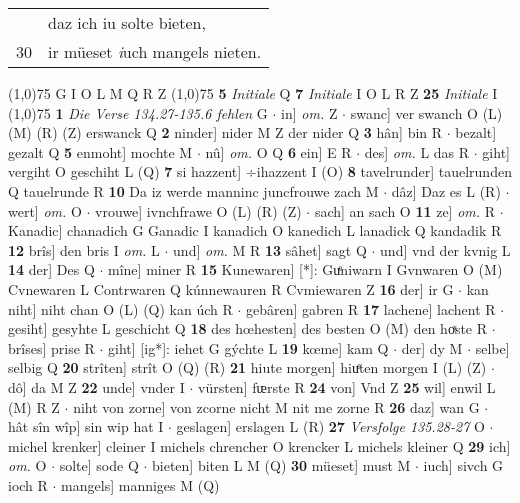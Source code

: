 \documentclass[8pt,a4paper,notitlepage]{article}
\begin{document}
\begin{table}[ht]
\begin{minipage}[t]{0.5\linewidth}
\begin{tabular}{rl}
 & daz ich iu solte bieten,\\ 
30 & ir müeset \textit{i}uch mangels nieten.\\ 
\end{tabular}
\scriptsize
\line(1,0){75} \newline
G I O L M Q R Z \newline
\line(1,0){75} \newline
\textbf{5} \textit{Initiale} Q  \textbf{7} \textit{Initiale} I O L R Z  \textbf{25} \textit{Initiale} I  \newline
\line(1,0){75} \newline
\textbf{1} \textit{Die Verse 134.27-135.6 fehlen} G   $\cdot$ in] \textit{om.} Z  $\cdot$ swanc] ver swanch O (L) (M) (R) (Z) erswanck Q \textbf{2} ninder] nider M Z der nider Q \textbf{3} hân] bin R  $\cdot$ bezalt] gezalt Q \textbf{5} enmoht] mochte M  $\cdot$ nû] \textit{om.} O Q \textbf{6} ein] E R  $\cdot$ des] \textit{om.} L das R  $\cdot$ giht] vergiht O geschiht L (Q) \textbf{7} si hazzent] ÷ihazzent I (O) \textbf{8} tavelrunder] tauelrunden Q tauelrunde R \textbf{10} Da iz werde manninc juncfrouwe zach M  $\cdot$ dâz] Daz es L (R)  $\cdot$ wert] \textit{om.} O  $\cdot$ vrouwe] ivnchfrawe O (L) (R) (Z)  $\cdot$ sach] an sach O \textbf{11} ze] \textit{om.} R  $\cdot$ Kanadic] chanadich G Ganadic I kanadich O kanedich L lanadick Q kandadik R \textbf{12} brîs] den bris I \textit{om.} L  $\cdot$ und] \textit{om.} M R \textbf{13} sâhet] sagt Q  $\cdot$ und] vnd der kvnig L \textbf{14} der] Des Q  $\cdot$ mîne] miner R \textbf{15} Kunewaren] [*]: Guͤniwarn I Gvnwaren O (M) Cvnewaren L Contrwaren Q kúnnewauren R Cvmiewaren Z \textbf{16} der] ir G  $\cdot$ kan niht] niht chan O (L) (Q) kan úch R  $\cdot$ gebâren] gabren R \textbf{17} lachene] lachent R  $\cdot$ gesiht] gesyhte L geschicht Q \textbf{18} des hœhesten] des besten O (M) den hoͯste R  $\cdot$ brîses] prise R  $\cdot$ giht] [ig*]: iehet G gýchte L \textbf{19} kœme] kam Q  $\cdot$ der] dy M  $\cdot$ selbe] selbig Q \textbf{20} strîten] strît O (Q) (R) \textbf{21} hiute morgen] hiuͤten morgen I (L) (Z)  $\cdot$ dô] da M Z \textbf{22} unde] vnder I  $\cdot$ vürsten] fᵫrste R \textbf{24} von] Vnd Z \textbf{25} wil] enwil L (M) R Z  $\cdot$ niht von zorne] von zcorne nicht M nit me zorne R \textbf{26} daz] wan G  $\cdot$ hât sîn wîp] sin wip hat I  $\cdot$ geslagen] erslagen L (R) \textbf{27} \textit{Versfolge 135.28-27} O   $\cdot$ michel krenker] cleiner I michels chrencher O krencker L michels kleiner Q \textbf{29} ich] \textit{om.} O  $\cdot$ solte] sode Q  $\cdot$ bieten] biten L M (Q) \textbf{30} müeset] must M  $\cdot$ iuch] sivch G ioch R  $\cdot$ mangels] manniges M (Q) \newline

\end{minipage}
\end{table}
\end{document}
